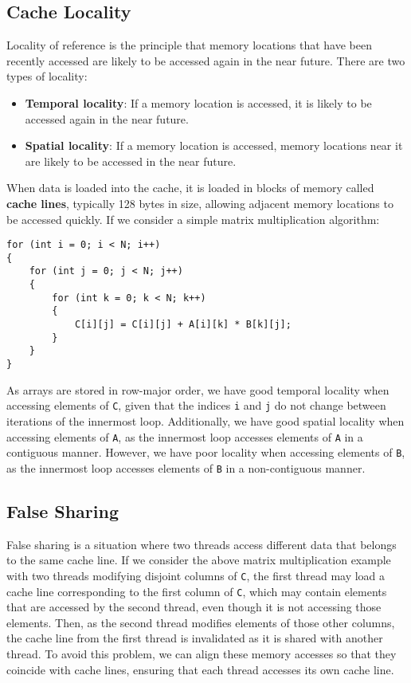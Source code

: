\documentclass{article}
\begin{document}
\subsection{Cache Locality}
Locality of reference is the principle that memory locations that have
been recently accessed are likely to be accessed again in the near
future. There are two types of locality:
\begin{itemize}
    \item \textbf{Temporal locality}: If a memory location is accessed,
          it is likely to be accessed again in the near future.
    \item \textbf{Spatial locality}: If a memory location is accessed,
          memory locations near it are likely to be accessed in the near
          future.
\end{itemize}
When data is loaded into the cache, it is loaded in blocks of memory
called \textbf{cache lines}, typically 128 bytes in size, allowing
adjacent memory locations to be accessed quickly. If we consider a
simple matrix multiplication algorithm:
\begin{verbatim}
for (int i = 0; i < N; i++)
{
    for (int j = 0; j < N; j++)
    {
        for (int k = 0; k < N; k++)
        {
            C[i][j] = C[i][j] + A[i][k] * B[k][j];
        }
    }
}
\end{verbatim}
As arrays are stored in row-major order, we have good temporal locality
when accessing elements of \texttt{C}, given that the indices
\texttt{i} and \texttt{j} do not change between
iterations of the innermost loop. Additionally, we have good spatial
locality when accessing elements of \texttt{A}, as the
innermost loop accesses elements of \texttt{A} in a
contiguous manner. However, we have poor locality when accessing
elements of \texttt{B}, as the innermost loop accesses
elements of \texttt{B} in a non-contiguous manner.
\subsection{False Sharing}
False sharing is a situation where two threads access different data
that belongs to the same cache line. If we consider the above matrix
multiplication example with two threads modifying disjoint columns of
\texttt{C}, the first thread may load a cache line
corresponding to the first column of \texttt{C}, which may
contain elements that are accessed by the second thread, even though it
is not accessing those elements. Then, as the second thread modifies
elements of those other columns, the cache line from the first thread
is invalidated as it is shared with another thread. To avoid this
problem, we can align these memory accesses so that they coincide with
cache lines, ensuring that each thread accesses its own cache line.
\end{document}
